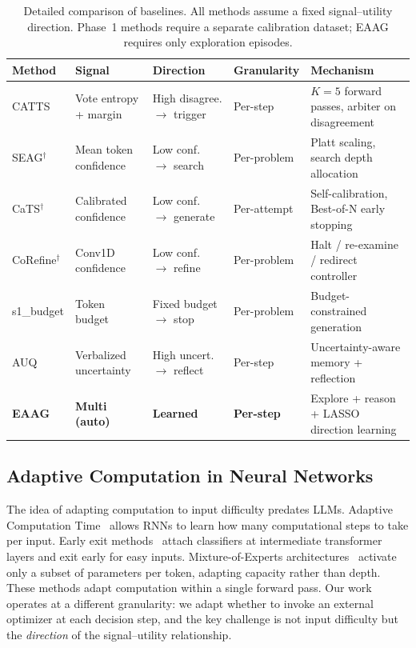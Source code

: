 \begin{table}[h]
\caption{Detailed comparison of baselines. All methods assume a
fixed signal--utility direction. Phase~1 methods require a separate
calibration dataset; EAAG requires only exploration episodes.}
\label{tab:baseline-detail}
\centering\small
\begin{tabular}{p{1.4cm}p{2.2cm}p{1.8cm}p{2.0cm}p{2.8cm}}
\toprule
Method & Signal & Direction & Granularity & Mechanism \\
\midrule
CATTS & Vote entropy + margin & High disagree. $\to$ trigger
  & Per-step & $K{=}5$ forward passes, arbiter on disagreement \\
SEAG$^\dagger$ & Mean token confidence & Low conf.\ $\to$ search
  & Per-problem & Platt scaling, search depth allocation \\
CaTS$^\dagger$ & Calibrated confidence & Low conf.\ $\to$ generate
  & Per-attempt & Self-calibration, Best-of-N early stopping \\
CoRefine$^\dagger$ & Conv1D confidence & Low conf.\ $\to$ refine
  & Per-problem & Halt / re-examine / redirect controller \\
s1\_budget & Token budget & Fixed budget $\to$ stop
  & Per-problem & Budget-constrained generation \\
AUQ & Verbalized uncertainty & High uncert.\ $\to$ reflect
  & Per-step & Uncertainty-aware memory + reflection~\citep{auq2026} \\
\midrule
\textbf{EAAG} & \textbf{Multi (auto)} & \textbf{Learned}
  & \textbf{Per-step} & Explore + reason + LASSO direction learning \\
\bottomrule
\end{tabular}
\end{table}

\subsection{Adaptive Computation in Neural Networks}

The idea of adapting computation to input difficulty predates LLMs.
Adaptive Computation Time~\citep{graves2016act} allows RNNs to learn
how many computational steps to take per input. Early exit
methods~\citep{teerapittayanon2016branchynet, elhoushi2024layerskip}
attach classifiers at intermediate transformer layers and exit early
for easy inputs. Mixture-of-Experts
architectures~\citep{shazeer2017moe, raposo2024mixtureofdepths}
activate only a subset of parameters per token, adapting capacity
rather than depth. These methods adapt computation within a single
forward pass. Our work operates at a different granularity: we
adapt whether to invoke an external optimizer at each decision step,
and the key challenge is not input difficulty but the
\emph{direction} of the signal--utility relationship.

